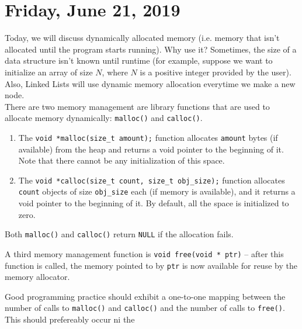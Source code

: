 \section{Friday, June 21, 2019} 
Today, we will discuss dynamically allocated memory (i.e. memory that isn't allocated until the program starts running). Why use it? Sometimes, the size of a data structure isn't known until runtime (for example, suppose we want to initialize an array of size $N$, where $N$ is a positive integer provided by the user). Also, Linked Lists will use dynamic memory allocation everytime we make a new node. \\

There are two memory management are library functions that are used to allocate memory dynamically: \texttt{malloc()} and \texttt{calloc()}. \begin{enumerate}
    \item The \verb!void *malloc(size_t amount);! function allocates \verb!amount! bytes (if available) from the heap and returns a void pointer to the beginning of it. Note that there cannot be any initialization of this space. 
    \item The \verb!void *calloc(size_t count, size_t obj_size);! function allocates \verb!count! objects of size \verb!obj_size! each (if memory is available), and it returns a void pointer to the beginning of it. By default, all the space is initialized to zero.
\end{enumerate}

Both \verb!malloc()! and \verb!calloc()! return \verb!NULL! if the allocation fails. 

A third memory management function is \verb!void free(void * ptr)! -- after this function is called, the memory pointed to by \verb!ptr! is now available for reuse by the memory allocator.


Good programming practice should exhibit a one-to-one mapping between the number of calls to \verb!malloc()! and \verb!calloc()! and the number of calls to \verb!free()!. This should prefereably occur ni the





